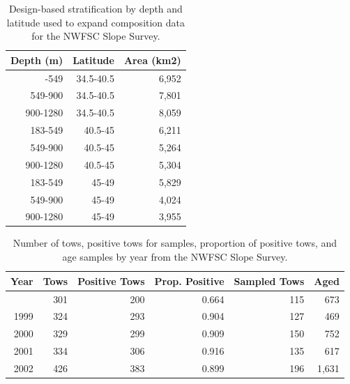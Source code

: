 \documentclass[
  english,
]{article}
\begin{document}
\endgroup

\pagebreak

\begingroup
\fontsize{9.0pt}{11.0pt}\selectfont

\begin{longtable}{rrr}

\caption{\label{tbl-nwslope-strata}Design-based stratification by depth
and latitude used to expand composition data for the NWFSC Slope
Survey.}

\tabularnewline

\toprule
Depth (m) & Latitude & Area (km2) \\ 
\midrule\addlinespace[2.5pt]
183-549 & 34.5-40.5 & 6,952 \\ 
549-900 & 34.5-40.5 & 7,801 \\ 
900-1280 & 34.5-40.5 & 8,059 \\ 
183-549 & 40.5-45 & 6,211 \\ 
549-900 & 40.5-45 & 5,264 \\ 
900-1280 & 40.5-45 & 5,304 \\ 
183-549 & 45-49 & 5,829 \\ 
549-900 & 45-49 & 4,024 \\ 
900-1280 & 45-49 & 3,955 \\ 
\bottomrule

\end{longtable}

\endgroup

\begingroup
\fontsize{9.0pt}{11.0pt}\selectfont

\begin{longtable}{rrrrrr}

\caption{\label{tbl-nwslope-samples}Number of tows, positive tows for
samples, proportion of positive tows, and age samples by year from the
NWFSC Slope Survey.}

\tabularnewline

\toprule
Year & Tows & Positive Tows & Prop. Positive & Sampled Tows & Aged \\ 
\midrule\addlinespace[2.5pt]
1998 & 301 & 200 & 0.664 & 115 & 673 \\ 
1999 & 324 & 293 & 0.904 & 127 & 469 \\ 
2000 & 329 & 299 & 0.909 & 150 & 752 \\ 
2001 & 334 & 306 & 0.916 & 135 & 617 \\ 
2002 & 426 & 383 & 0.899 & 196 & 1,631 \\ 
\bottomrule

\end{longtable}
\end{document}

